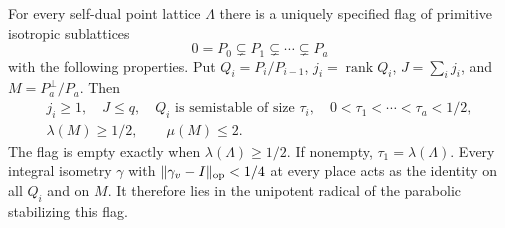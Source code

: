 \begin{proposition}\label{nu-canonical-flag}
For every self-dual point lattice $\Lambda$ there
is a uniquely specified flag of primitive
isotropic sublattices
\[
          0=P_0\subsetneq P_1\subsetneq\cdots
                                      \subsetneq P_a
\]
with the following properties.  Put
$Q_i=P_i/P_{i-1}$, $j_i=\operatorname{rank}Q_i$,
$J=\sum_i j_i$, and $M=P_a^\perp/P_a$.
Then
\begin{equation}\label{nu-flag-properties}
 \begin{gathered}
 j_i\ge1,\quad J\le q,\quad
 Q_i\text{ is semistable of size }\tau_i,\quad
             0<\tau_1<\cdots<\tau_a<1/2,\\
 \lambda(M)\ge1/2,\qquad \mu(M)\le2.
 \end{gathered}
\end{equation}
The flag is empty exactly when $\lambda(\Lambda)\ge1/2$.
If nonempty, $\tau_1=\lambda(\Lambda)$.
Every integral isometry $\gamma$ with
$\|\gamma_v-I\|_{\rm op}<1/4$ at every place acts
as the identity on all $Q_i$ and on $M$.
It therefore lies in the unipotent radical of the
parabolic stabilizing this flag.
\end{proposition}

